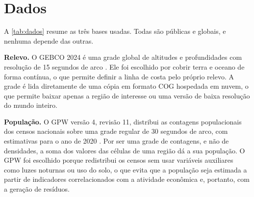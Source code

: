 \section{Dados}
\label{sec:dados}

A \autoref{tab:dados} resume as três bases usadas. Todas são públicas e globais, e nenhuma depende das outras.

\begin{table}[ht!]
	\centering
\end{table}

\textbf{Relevo.} O \gls{GEBCO} 2024 é uma grade global de altitudes e profundidades com resolução de 15 segundos de arco \cite{gebco2024}. Ele foi escolhido por cobrir terra e oceano de forma contínua, o que permite definir a linha de costa pelo próprio relevo. A grade é lida diretamente de uma cópia em formato \gls{COG} hospedada em nuvem, o que permite baixar apenas a região de interesse ou uma versão de baixa resolução do mundo inteiro.

\textbf{População.} O \gls{GPW} versão 4, revisão 11, distribui as contagens populacionais dos censos nacionais sobre uma grade regular de 30 segundos de arco, com estimativas para o ano de 2020 \cite{gpw4}. Por ser uma grade de contagens, e não de densidades, a soma dos valores das células de uma região dá a sua população. O GPW foi escolhido porque redistribui os censos sem usar variáveis auxiliares como luzes noturnas ou uso do solo, o que evita que a população seja estimada a partir de indicadores correlacionados com a atividade econômica e, portanto, com a geração de resíduos.

